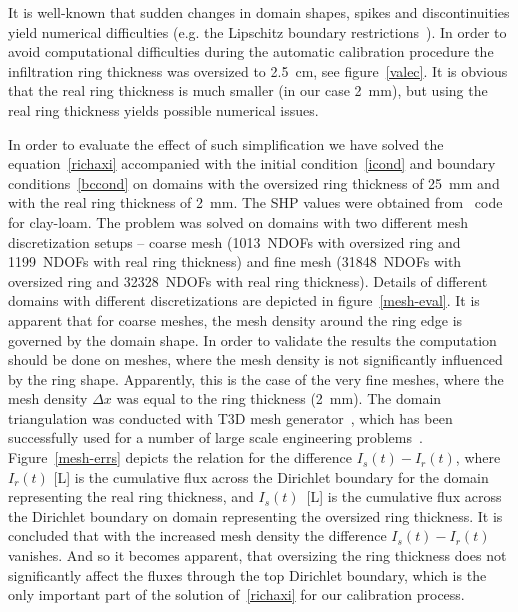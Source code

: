 \documentclass[review,times,3p,10pt]{elsarticle}
\begin{document}
{%
It is well-known that sudden changes in domain shapes, spikes and discontinuities yield numerical difficulties (e.g. the Lipschitz boundary restrictions~\citep{braess}).
In order to avoid computational difficulties during the automatic calibration procedure the infiltration ring thickness was oversized  to 2.5~cm, see figure~\ref{valec}. It is obvious that the real ring thickness is much smaller (in our case 2~mm), but using the real ring thickness yields possible numerical issues. 

{ In order to evaluate the effect of such simplification we have solved the equation~\eqref{richaxi} accompanied with the initial condition~\eqref{icond} and boundary conditions~\eqref{bccond} on domains with the oversized ring thickness of 25~mm and with the real ring thickness of 2~mm. The SHP values were obtained from~\citep{retc} code for clay-loam. The problem was solved on domains with two different mesh discretization setups -- coarse mesh (1013~NDOFs with oversized ring and 1199~NDOFs with real ring thickness) and fine mesh (31848~NDOFs with oversized ring and 32328~NDOFs with real ring thickness).  Details of different domains with different discretizations are depicted in figure~\ref{mesh-eval}. It is apparent that for coarse meshes, the mesh density around the ring edge is governed by the domain shape. In order to validate the results the computation should be done on meshes, where the mesh density is not significantly influenced by the ring shape. Apparently, this is the case of the very fine meshes, where the mesh density $\Delta x$ was equal to the ring thickness (2~mm). The domain triangulation was conducted with T3D mesh generator~\citep{t3d}, which has been successfully used for a number of large scale engineering problems~\citep{rypl2010, kruis2002}. Figure~\ref{mesh-errs} depicts the relation for the difference $I_s(t)-I_r(t)$, where $I_r(t)$ [L] is the cumulative flux across the Dirichlet boundary for the domain representing the real ring thickness, and $I_s(t)$~[L] is the cumulative flux across the Dirichlet boundary on domain representing the oversized ring thickness. It is concluded that with the increased mesh density the difference $I_s(t)-I_r(t)$ vanishes.  And so it becomes apparent, that oversizing the ring thickness does not significantly affect the fluxes through the top Dirichlet boundary, which is the only important part of the solution of~\eqref{richaxi} for our calibration process. 

}}
\end{document}
